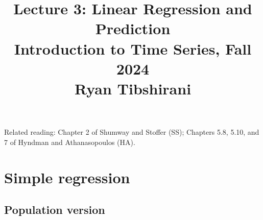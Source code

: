 \documentclass{article}
\title{Lecture 3: Linear Regression and Prediction \\ \smallskip  
\large Introduction to Time Series, Fall 2024 \\ \smallskip
Ryan Tibshirani}
\date{}
\begin{document}
\maketitle
\RaggedRight
\vspace{-50pt}

Related reading: Chapter 2 of Shumway and Stoffer (SS); Chapters 5.8, 5.10, and
7 of Hyndman and Athanasopoulos (HA).   

\section{Simple regression}

\subsection{Population version}
\end{document}
